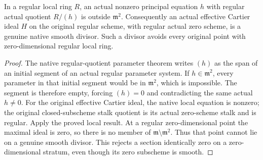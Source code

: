 \begin{lemma}
\label{lem:kn-nadel-bertini-snc-regular-cartier}
\leanok
In a regular local ring $R$, an actual nonzero principal equation $h$
with regular actual quotient $R/(h)$ is outside $\mathfrak m^2$.
Consequently an actual effective Cartier ideal $H$ on the original regular
scheme, with regular actual zero scheme, is a genuine native smooth
divisor.  Such a divisor avoids every original point with zero-dimensional
regular local ring.
\end{lemma}
\begin{proof}
The native regular-quotient parameter theorem writes $(h)$ as the span of
an initial segment of an actual regular parameter system.  If
$h\in\mathfrak m^2$, every parameter in that initial segment would be in
$\mathfrak m^2$, which is impossible.  The segment is therefore empty,
forcing $(h)=0$ and contradicting the same actual $h\ne0$.  For the
original effective Cartier ideal, the native local equation is nonzero;
the original closed-subscheme stalk quotient is its actual zero-scheme
stalk and is regular.  Apply the proved local result.  At a regular
zero-dimensional point the maximal ideal is zero, so there is no member
of $\mathfrak m\setminus\mathfrak m^2$.  Thus that point cannot lie on a
genuine smooth divisor.  This rejects a section identically zero on a
zero-dimensional stratum, even though its zero subscheme is smooth.
\end{proof}

